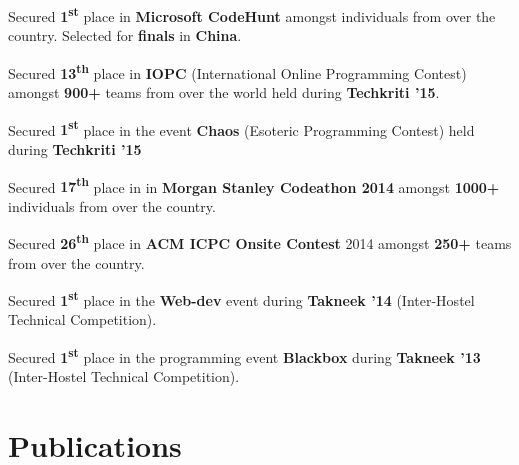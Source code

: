\documentclass[a4paper]{norm-resume}
\begin{document}
\begin{tightitemize}
	\item Secured \textbf{1\textsuperscript{st}} place in \textbf{Microsoft CodeHunt} amongst individuals from over the country. Selected for \textbf{finals} in \textbf{China}.
	\item Secured \textbf{13\textsuperscript{th}} place in \textbf{IOPC} (International Online Programming Contest) amongst \textbf{900+} teams from over the world held during \textbf{Techkriti '15}.
	\item Secured \textbf{1\textsuperscript{st}} place in the event \textbf{Chaos} (Esoteric Programming Contest) held during \textbf{Techkriti '15}
	\item Secured \textbf{17\textsuperscript{th}} place in in \textbf{Morgan Stanley Codeathon 2014} amongst \textbf{1000+} individuals from over the country.
	\item Secured \textbf{26\textsuperscript{th}} place in \textbf{ACM ICPC Onsite Contest} 2014 amongst \textbf{250+} teams from over the country.
	\item Secured \textbf{1\textsuperscript{st}} place in the \textbf{Web-dev} event during \textbf{Takneek '14} (Inter-Hostel Technical Competition).
	\item Secured \textbf{1\textsuperscript{st}} place in the programming event \textbf{Blackbox} during \textbf{Takneek '13} (Inter-Hostel Technical Competition).
\end{tightitemize}

\vspace{1mm}	%


\section{Publications \hrulefill}
		
\vspace{2mm} %

				

\vspace{2mm} %

				
\end{document}
